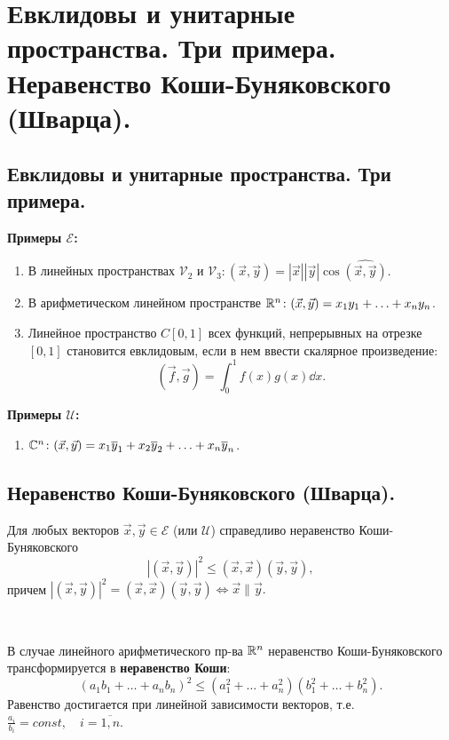 \section{
    Евклидовы и унитарные пространства. Три примера. Неравенство Коши-Буняковского (Шварца).
}

\subsection{
    Евклидовы и унитарные пространства. Три примера.
}

\textbf{Примеры $\mathcal{E}$:}
\begin{enumerate}
    \item В линейных пространствах $\mathcal{V}_2$ и $\mathcal{V}_3 \colon (\vec{x}, \vec{y}) = |\vec{x}||\vec{y}|\cos \widehat{(\vec{x}, \vec{y})}$.
    \item В арифметическом линейном пространстве $\mathbb{R}^n \colon (\vec{x}, \vec{y}) = x_1y_1 + \ldots + x_ny_n$. 
    \item Линейное пространство $C[0, 1]$ всех функций, непрерывных на отрезке $[0, 1]$ становится евклидовым, если в нем ввести скалярное произведение:
    $$(\vec{f}, \vec{g}) = \int_{0}^{1} f(x)g(x) \dd x.$$
\end{enumerate}

\textbf{Примеры $\mathcal{U}$:}

\begin{enumerate}
    \item $\mathbb{C}^n \colon (\vec{x}, \vec{y}) = x_1\overline{y}_1 + x_2\overline{y}_2 + \ldots + x_n\overline{y}_n$.
\end{enumerate}


\newpage


\subsection{
    Неравенство Коши-Буняковского (Шварца).
}

\begin{theorem}
    Для любых векторов $\vec{x}, \vec{y} \in \mathcal{E}$ (или $\mathcal{U}$) справедливо неравенство Коши-Буняковского
    $$|(\vec{x}, \vec{y})|^2 \leq (\vec{x}, \vec{x}) (\vec{y}, \vec{y}),$$
    причем $|(\vec{x}, \vec{y})|^2 = (\vec{x}, \vec{x}) (\vec{y}, \vec{y}) \iff \vec{x} \parallel \vec{y}.$
\end{theorem}

\begin{corollary}~

    В случае линейного арифметического пр-ва $\mathbb{R}^n$ неравенство Коши-Буняковского трансформируется в \textbf{неравенство Коши}:
    $$(a_1b_1 + \ldots + a_nb_n)^2 \leq (a_1^2 + \ldots + a_n^2)(b_1^2 + \ldots + b_n^2).$$
    Равенство достигается при линейной зависимости векторов, т.е. $\frac{a_i}{b_i} = const, \quad i = \overline{1, n}$.
\end{corollary}


